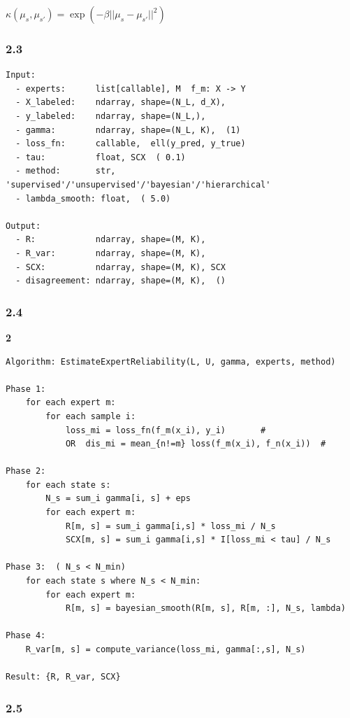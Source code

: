 \documentclass[
  12pt,
]{article}
\begin{document}
 \(\kappa(\mu_s, \mu_{s'}) = \exp(-\beta ||\mu_s - \mu_{s'}||^2)\)


\subsubsection{2.3
}\label{ux8f93ux5165ux8f93ux51faux89c4ux8303-1}

\begin{verbatim}
Input:
  - experts:      list[callable], M  f_m: X -> Y
  - X_labeled:    ndarray, shape=(N_L, d_X), 
  - y_labeled:    ndarray, shape=(N_L,), 
  - gamma:        ndarray, shape=(N_L, K),  (1)
  - loss_fn:      callable,  ell(y_pred, y_true)
  - tau:          float, SCX  ( 0.1)
  - method:       str, 'supervised'/'unsupervised'/'bayesian'/'hierarchical'
  - lambda_smooth: float,  ( 5.0)

Output:
  - R:            ndarray, shape=(M, K), 
  - R_var:        ndarray, shape=(M, K), 
  - SCX:          ndarray, shape=(M, K), SCX 
  - disagreement: ndarray, shape=(M, K),  ()
\end{verbatim}

\subsubsection{2.4 }\label{ux5b9eux73b0ux65b9ux6cd5-1}

\textbf{ 2}

\begin{verbatim}
Algorithm: EstimateExpertReliability(L, U, gamma, experts, method)

Phase 1: 
    for each expert m:
        for each sample i:
            loss_mi = loss_fn(f_m(x_i), y_i)       # 
            OR  dis_mi = mean_{n!=m} loss(f_m(x_i), f_n(x_i))  # 

Phase 2: 
    for each state s:
        N_s = sum_i gamma[i, s] + eps
        for each expert m:
            R[m, s] = sum_i gamma[i,s] * loss_mi / N_s
            SCX[m, s] = sum_i gamma[i,s] * I[loss_mi < tau] / N_s

Phase 3:  ( N_s < N_min)
    for each state s where N_s < N_min:
        for each expert m:
            R[m, s] = bayesian_smooth(R[m, s], R[m, :], N_s, lambda)

Phase 4: 
    R_var[m, s] = compute_variance(loss_mi, gamma[:,s], N_s)

Result: {R, R_var, SCX}
\end{verbatim}

\subsubsection{2.5
}\label{ux4e0eux5176ux4ed6ux6a21ux5757ux7684ux534fux8c03-1}
\end{document}
